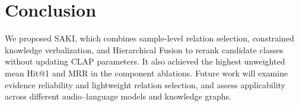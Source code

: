 \section{Conclusion}\label{sec:conclusion}

 We proposed SAKI, which combines sample-level relation selection, constrained knowledge verbalization, and Hierarchical Fusion to rerank candidate classes without updating CLAP parameters.  It also achieved the highest unweighted mean Hit@1 and MRR in the component ablations.  Future work will examine evidence reliability and lightweight relation selection, and assess applicability across different audio--language models and knowledge graphs.
